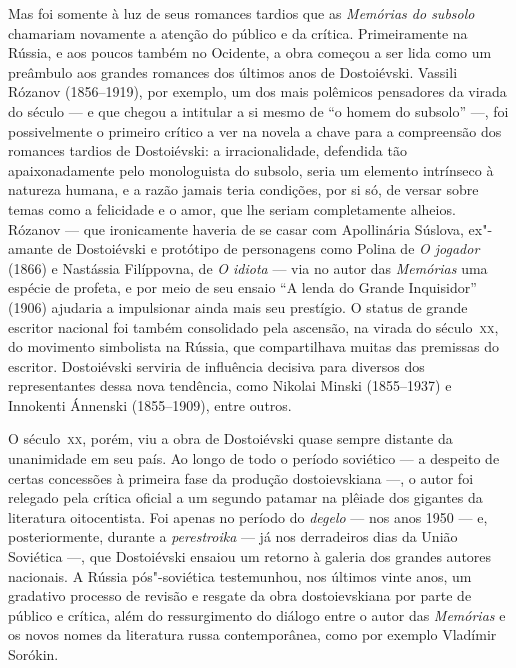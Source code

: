 Mas foi somente à luz de seus romances tardios que as \textit{Memórias do
subsolo} chamariam novamente a atenção do público e da crítica.  Primeiramente
na Rússia, e aos poucos também no Ocidente, a obra começou a ser lida como um
preâmbulo aos grandes romances dos últimos anos de Dostoiévski. Vassili Rózanov
(1856--1919), por exemplo, um dos mais polêmicos pensadores da virada do século
--- e que chegou a intitular a si mesmo de “o homem do subsolo” ---, foi
possivelmente o primeiro crítico a ver na novela a chave para a compreensão dos
romances tardios de Dostoiévski: a irracionalidade, defendida tão
apaixonadamente pelo monologuista do subsolo, seria um elemento
intrínseco à natureza humana, e a razão jamais teria condições, por si só, de
versar sobre temas como a felicidade e o amor, que lhe seriam completamente
alheios. Rózanov --- que ironicamente haveria de se casar com Apollinária
Súslova, ex"-amante de Dostoiévski e protótipo de personagens como Polina de
\textit{O jogador} (1866) e Nastássia Filíppovna, de \textit{O idiota} --- via no
autor das \textit{Memórias} uma espécie de profeta, e por meio de seu ensaio “A
lenda do Grande Inquisidor” (1906) ajudaria a impulsionar ainda mais seu
prestígio. O status de grande escritor nacional foi também consolidado pela
ascensão, na virada do século~\textsc{xx}, do movimento simbolista na Rússia, que
compartilhava muitas das premissas do escritor. Dostoiévski serviria de
influência decisiva para diversos dos representantes dessa nova tendência, como
Nikolai Minski (1855--1937) e Innokenti Ánnenski (1855--1909), entre outros.

O século~\textsc{xx}, porém, viu a obra de Dostoiévski quase sempre distante da
unanimidade em seu país. Ao longo de todo o período soviético --- a despeito de
certas concessões à primeira fase da produção dostoievskiana ---, o autor foi
relegado pela crítica oficial a um segundo patamar na plêiade dos gigantes da
literatura oitocentista. Foi apenas no período do \textit{degelo} --- nos anos
1950 --- e, posteriormente, durante a \textit{perestroika} --- já nos derradeiros
dias da União Soviética ---, que Dostoiévski ensaiou um retorno à galeria dos
grandes autores nacionais. A Rússia pós"-soviética testemunhou, nos últimos
vinte anos, um gradativo processo de revisão e resgate da obra dostoievskiana
por parte de público e crítica, além do ressurgimento do diálogo entre o autor
das \textit{Memórias} e os novos nomes da literatura russa contemporânea, como
por exemplo Vladímir Sorókin.

